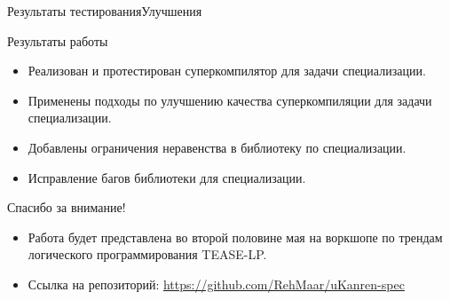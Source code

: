 \documentclass[xcolor=table]{beamer}
\begin{document}
\begin{frame}{Результаты тестирования}{\small Улучшения}
%
%
%
\end{frame}


%
\begin{frame}{Результаты работы}
  \begin{itemize}
  \item Реализован и протестирован суперкомпилятор для задачи специализации.
  \item Применены подходы по улучшению качества суперкомпиляции для задачи специализации.
  \item Добавлены ограничения неравенства в библиотеку по специализации.
  \item Исправление багов библиотеки для специализации.
  \end{itemize}
\end{frame}

\begin{frame}{Спасибо за внимание!}
\begin{itemize}
\item Работа будет представлена во второй половине мая на воркшопе по трендам логического программирования TEASE-LP.
\item Ссылка на репозиторий: \url{https://github.com/RehMaar/uKanren-spec}
\end{itemize}
\end{frame}


\end{document}
